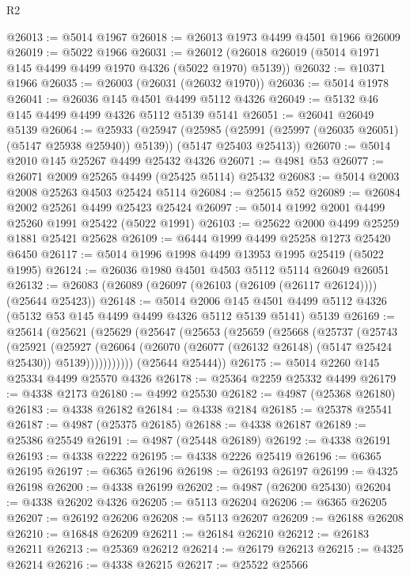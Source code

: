 \begin{lexlean}{R2}
\begin{coremodule}
@26013 := @5014 @1967
@26018 := @26013 @1973 @4499 @4501 @1966 @26009
@26019 := @5022 @1966
@26031 := @26012 (@26018 @26019 (@5014 @1971 @145 @4499 @4499 @1970 @4326 (@5022 @1970) @5139))
@26032 := @10371 @1966
@26035 := @26003 (@26031 (@26032 @1970))
@26036 := @5014 @1978
@26041 := @26036 @145 @4501 @4499 @5112 @4326
@26049 := @5132 @46 @145 @4499 @4499 @4326 @5112 @5139 @5141
@26051 := @26041 @26049 @5139
@26064 := @25933
    (@25947
      (@25985 (@25991 (@25997 (@26035 @26051) (@5147 @25938 @25940)) @5139))
      (@5147 @25403 @25413))
@26070 := @5014 @2010 @145 @25267 @4499 @25432 @4326
@26071 := @4981 @53
@26077 := @26071 @2009 @25265 @4499 (@25425 @5114) @25432
@26083 := @5014 @2003 @2008 @25263 @4503 @25424 @5114
@26084 := @25615 @52
@26089 := @26084 @2002 @25261 @4499 @25423 @25424
@26097 := @5014 @1992 @2001 @4499 @25260 @1991 @25422 (@5022 @1991)
@26103 := @25622 @2000 @4499 @25259 @1881 @25421 @25628
@26109 := @6444 @1999 @4499 @25258 @1273 @25420 @6450
@26117 := @5014 @1996 @1998 @4499 @13953 @1995 @25419 (@5022 @1995)
@26124 := @26036 @1980 @4501 @4503 @5112 @5114 @26049 @26051
@26132 := @26083 (@26089 (@26097 (@26103 (@26109 (@26117 @26124)))) (@25644 @25423))
@26148 := @5014
    @2006
    @145
    @4501
    @4499
    @5112
    @4326
    (@5132 @53 @145 @4499 @4499 @4326 @5112 @5139 @5141)
    @5139
@26169 := @25614
    (@25621
      (@25629
        (@25647
          (@25653
            (@25659
              (@25668
                (@25737
                  (@25743
                    (@25921
                      (@25927
                        (@26064
                          (@26070 (@26077 (@26132 @26148) (@5147 @25424 @25430)) @5139)))))))))))
      (@25644 @25444))
@26175 := @5014 @2260 @145 @25334 @4499 @25570 @4326
@26178 := @25364 @2259 @25332 @4499
@26179 := @4338 @2173
@26180 := @4992 @25530
@26182 := @4987 (@25368 @26180)
@26183 := @4338 @26182
@26184 := @4338 @2184
@26185 := @25378 @25541
@26187 := @4987 (@25375 @26185)
@26188 := @4338 @26187
@26189 := @25386 @25549
@26191 := @4987 (@25448 @26189)
@26192 := @4338 @26191
@26193 := @4338 @2222
@26195 := @4338 @2226 @25419
@26196 := @6365 @26195
@26197 := @6365 @26196
@26198 := @26193 @26197
@26199 := @4325 @26198
@26200 := @4338 @26199
@26202 := @4987 (@26200 @25430)
@26204 := @4338 @26202 @4326
@26205 := @5113 @26204
@26206 := @6365 @26205
@26207 := @26192 @26206
@26208 := @5113 @26207
@26209 := @26188 @26208
@26210 := @16848 @26209
@26211 := @26184 @26210
@26212 := @26183 @26211
@26213 := @25369 @26212
@26214 := @26179 @26213
@26215 := @4325 @26214
@26216 := @4338 @26215
@26217 := @25522 @25566

\end{coremodule}
\end{lexlean}

